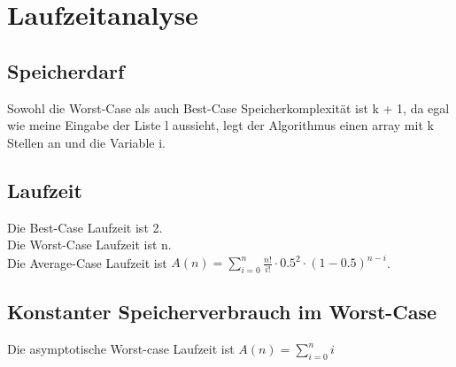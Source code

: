 \section{Laufzeitanalyse}
\subsection{Speicherdarf}
Sowohl die Worst-Case als auch Best-Case Speicherkomplexität ist k + 1, da egal wie meine Eingabe der Liste l aussieht, legt der Algorithmus einen array mit k Stellen an und die Variable i.
\subsection{Laufzeit}
Die Best-Case Laufzeit ist 2.\\
Die Worst-Case Laufzeit ist n.\\
Die Average-Case Laufzeit ist $A(n)=\sum\nolimits_{i=0}^n \frac{n!}{i!} \cdot 0.5^2 \cdot (1-0.5)^{n-i}$.\\
\subsection{Konstanter Speicherverbrauch im Worst-Case}

Die asymptotische Worst-case Laufzeit ist $A(n)=\sum\nolimits_{i=0}^n i$